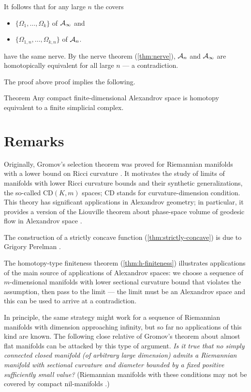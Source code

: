 It follows that for any large $n$ the covers 
\begin{itemize}
\item $\{\Omega_{1},\dots,\Omega_{k}\}$ of $\mathcal{A}_\infty$ and 
\item $\{\Omega_{1,n},\dots,\Omega_{k,n}\}$ of $\mathcal{A}_n$.
\end{itemize}
have the same nerve.
By the nerve theorem (\ref{thm:nerve}), $\mathcal{A}_n$ and $\mathcal{A}_\infty$ are homotopically equivalent for all large $n$ --- a contradiction.
\qeds

The proof above proof implies the following.

\begin{thm}{Theorem}\label{thm:finite-dim-hom-simplicial}
Any compact finite-dimensional Alexandrov space is homotopy equivalent to a finite simplicial complex.
\end{thm}

\section{Remarks}

Originally, Gromov's selection theorem was proved for Riemannian manifolds with a lower bound on Ricci curvature \cite{gromov1981}.
It motivates the study of limits of manifolds with lower Ricci curvature bounds and their synthetic generalizations, the so-called $\mathrm{CD}(K,m)$ spaces; $\mathrm{CD}$ stands for curvature-dimension condition.
This theory has significant applications in Alexandrov geometry;
in particular, it provides a version of the Liouville theorem about phase-space volume of geodesic flow in Alexandrov space \cite{brue-mondino-semola}.

The construction of a strictly concave function (\ref{thm:strictly-concave}) is due to Grigory Perelman \cite{perelman1993,perelman-petrunin}.

The homotopy-type finiteness theorem (\ref{thm:h-finiteness}) illustrates applications of the main source of applications of Alexandrov spaces:
we choose a sequence of $m$-dimensional manifolds with lower sectional curvature bound that violates the assumption, 
then pass to the limit --- the limit must be an Alexandrov space and this can be used to arrive at a contradiction.

In principle, the same strategy might work for a sequence of Riemannian manifolds with dimension approaching infinity, but so far no applications of this kind are known.
The following close relative of Gromov's theorem about almost flat manifolds can be attacked by this type of argument.
\textit{Is it true that no simply connected closed manifold (of arbitrary large dimension) admits a Riemannian manifold with sectional curvature and diameter bounded by a fixed positive sufficiently small value?}
(Riemannian manifolds with these conditions may not be covered by compact nil-manifolds \cite{guzhvina2008}.)

